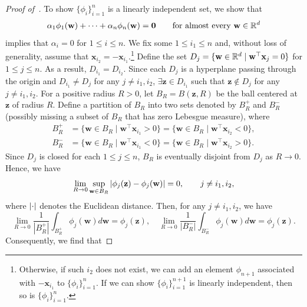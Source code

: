 \begin{proof}[Proof of~]
To show $\{\phi_i\}_{i=1}^n$ is a linearly independent set, we show that
\begin{equation}\label{eq.linindep}
    \alpha_1 \phi_1(\mathbf{w}) + \cdots + \alpha_n \phi_n(\mathbf{w}) = \mathbf{0} \qquad \text{for almost every $\mathbf{w} \in \mathbb{R}^{d}$}
\end{equation}
implies that $\alpha_i=0$ for $1\leq i\leq n$. We fix some $1 \leq i_1 \leq n$ and, without loss of generality, assume that $\mathbf{x}_{i_2} = -\mathbf{x}_{i_1}$.\footnote{Otherwise, if such $i_2$ does not exist, we can add an element $\phi_{n+1}$ associated with $-\mathbf{x}_{i_1}$ to $\{\phi_i\}_{i=1}^n$. If we can show $\{\phi_i\}_{i=1}^{n+1}$ is linearly independent, then so is $\{\phi_i\}_{i=1}^n$.} Define the set $D_j = \{\mathbf{w} \in \mathbb{R}^d \mid \mathbf{w}^\top \mathbf{x}_{j} = 0\}$ for $1 \leq j \leq n$. As a result, $D_{i_1} = D_{i_2}$. Since each $D_j$ is a hyperplane passing through the origin and $D_{i_1} \neq D_j$ for any $j \neq i_1, i_2$, $\exists \mathbf{z} \in D_{i_1}$ such that $\mathbf{z} \notin D_j$ for any $j \neq i_1, i_2$. For a positive radius $R > 0$, let $B_R = B(\mathbf{z},R)$ be the ball centered at $\mathbf{z}$ of radius $R$. Define a partition of $B_R$ into two sets denoted by $B_R^+$ and $B_R^-$ (possibly missing a subset of $B_R$ that has zero Lebesgue measure), where
\begin{align*}
    B_R^+ &= \{\mathbf{w} \in B_R \mid \mathbf{w}^\top \mathbf{x}_{i_1} > 0\} = \{\mathbf{w} \in B_R \mid \mathbf{w}^\top \mathbf{x}_{i_2} < 0\}, \\
    B_R^- &= \{\mathbf{w} \in B_R \mid \mathbf{w}^\top \mathbf{x}_{i_1} < 0\} = \{\mathbf{w} \in B_R \mid \mathbf{w}^\top \mathbf{x}_{i_2} > 0\}.
\end{align*}
Since $D_j$ is closed for each $1 \leq j \leq n$, $B_R$ is eventually disjoint from $D_j$ as $R \rightarrow 0$. Hence, we have
\begin{equation*}
    \lim_{R\rightarrow 0} \sup_{\mathbf{w} \in B_R} \left|\phi_j(\mathbf{z}) - \phi_j(\mathbf{w})\right| = 0, \qquad  j \neq i_1, i_2,
\end{equation*}
where $\left|\cdot\right|$ denotes the Euclidean distance. Then, for any $j \neq i_1, i_2$, we have
\begin{equation*}
    \lim_{R\rightarrow 0}\frac{1}{|B_R^+|}\int_{B_R^+} \phi_j(\mathbf{w}) d\mathbf{w} = \phi_j(\mathbf{z}),\quad \lim_{R\rightarrow 0}\frac{1}{|B_R^-|}\int_{B_R^-} \phi_j(\mathbf{w}) d\mathbf{w} = \phi_j(\mathbf{z}).
\end{equation*}
Consequently, we find that

\end{proof}
